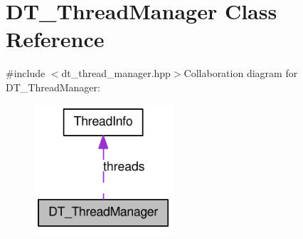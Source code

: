 \hypertarget{class_d_t___thread_manager}{
\section{DT\_\-ThreadManager Class Reference}
\label{class_d_t___thread_manager}
}


{\ttfamily \#include $<$dt\_\-thread\_\-manager.hpp$>$}Collaboration diagram for DT\_\-ThreadManager:\nopagebreak
\begin{figure}[H]
\begin{center}
\leavevmode
\includegraphics[width=146pt]{class_d_t___thread_manager__coll__graph}
\end{center}
\end{figure}
